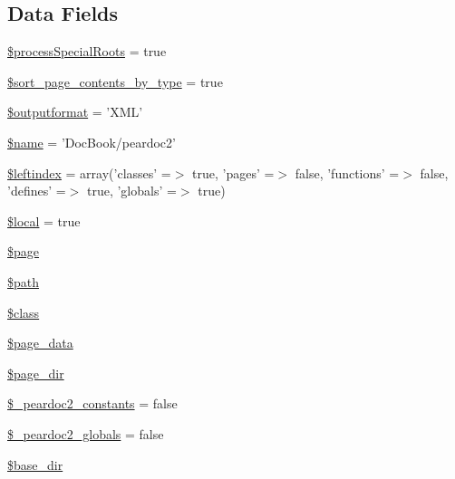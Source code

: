 \subsection*{\-Data \-Fields}
\begin{DoxyCompactItemize}
\item 
\hyperlink{class_x_m_l_doc_bookpeardoc2_converter_adcae2bdef17468fc5bf2f15981da497e}{\$process\-Special\-Roots} = true
\item 
\hyperlink{class_x_m_l_doc_bookpeardoc2_converter_ab5dae87e1968b35e37687a763216a835}{\$sort\-\_\-page\-\_\-contents\-\_\-by\-\_\-type} = true
\item 
\hyperlink{class_x_m_l_doc_bookpeardoc2_converter_af0bfe153c049d957e8ea29b147025108}{\$outputformat} = '\-X\-M\-L'
\item 
\hyperlink{class_x_m_l_doc_bookpeardoc2_converter_ab2fc40d43824ea3e1ce5d86dee0d763b}{\$name} = '\-Doc\-Book/peardoc2'
\item 
\hyperlink{class_x_m_l_doc_bookpeardoc2_converter_ab49669c749559bb7833762878adb8f0c}{\$leftindex} = array('classes' =$>$ true, 'pages' =$>$ false, 'functions' =$>$ false, 'defines' =$>$ true, 'globals' =$>$ true)
\item 
\hyperlink{class_x_m_l_doc_bookpeardoc2_converter_a6d3acd7bb365291cea0fc4b71fe5682a}{\$local} = true
\item 
\hyperlink{class_x_m_l_doc_bookpeardoc2_converter_a0a44e6760141442bb439b1ab1395d8ff}{\$page}
\item 
\hyperlink{class_x_m_l_doc_bookpeardoc2_converter_a0a4baf0b22973c07685c3981f0d17fc4}{\$path}
\item 
\hyperlink{class_x_m_l_doc_bookpeardoc2_converter_a252ba022809910ea710a068fc1bab657}{\$class}
\item 
\hyperlink{class_x_m_l_doc_bookpeardoc2_converter_a22fa57ada47299e1b00ca90f550a1194}{\$page\-\_\-data}
\item 
\hyperlink{class_x_m_l_doc_bookpeardoc2_converter_ab554c658003c5e2653580ba881cd50eb}{\$page\-\_\-dir}
\item 
\hyperlink{class_x_m_l_doc_bookpeardoc2_converter_ac14cf395178914a75224ddfd9ae6de9f}{\$\-\_\-peardoc2\-\_\-constants} = false
\item 
\hyperlink{class_x_m_l_doc_bookpeardoc2_converter_af5a6db335743288328d6330db46fdb7b}{\$\-\_\-peardoc2\-\_\-globals} = false
\item 
\hyperlink{class_x_m_l_doc_bookpeardoc2_converter_aa36f57c62963507498e1181f9a75bbb9}{\$base\-\_\-dir}
\item 

\end{DoxyCompactItemize}
